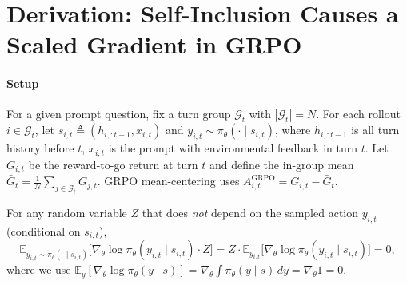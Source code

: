\section{Derivation: Self-Inclusion Causes a Scaled Gradient in GRPO}
\label{app:grpo-bias-derivation}

\paragraph{Setup}
For a given prompt question, fix a turn group $\mathcal{G}_{t}$ with $|\mathcal{G}_{t}|=N$.
For each rollout $i\in\mathcal{G}_{t}$, let
$s_{i,t}\triangleq(h_{i,:t-1},x_{i,t})$ and $y_{i,t}\sim\pi_\theta(\cdot\mid s_{i,t})$,
where $h_{i,:t-1}$ is all turn history before $t$, $x_{i,t}$ is the prompt with environmental feedback in turn $t$. Let $G_{i,t}$ be the reward-to-go return at turn $t$ and define the in-group mean
$\bar G_{t}=\frac{1}{N}\sum_{j\in\mathcal{G}_{t}}G_{j,t}$.
GRPO mean-centering uses $A^{\text{GRPO}}_{i,t}=G_{i,t}-\bar G_{t}$.

For any random variable $Z$ that does \emph{not} depend on the sampled action $y_{i,t}$ (conditional on $s_{i,t}$),
\begin{equation}
\mathbb{E}_{y_{i,t}\sim\pi_\theta(\cdot\mid s_{i,t})}
\big[\nabla_\theta \log \pi_\theta(y_{i,t}\mid s_{i,t})\cdot Z\big]
= Z\cdot
\mathbb{E}_{y_{i,t}}\big[\nabla_\theta \log \pi_\theta(y_{i,t}\mid s_{i,t})\big]
=0,
\label{eq:score-zero}
\end{equation}
where we use $\mathbb{E}_{y}[\nabla_\theta \log \pi_\theta(y\mid s)]
=\nabla_\theta\!\int \pi_\theta(y\mid s)\,dy=\nabla_\theta 1=0$.

